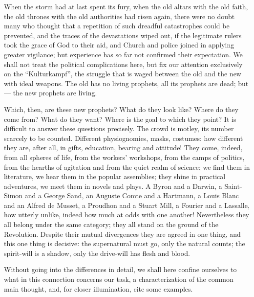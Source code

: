 \documentclass[12pt,a4paper,openany]{book}
\newcommand{\opage}[1]{\marginnote{\footnotesize\textit{[#1]}}}
\begin{document}
When the storm had at last spent its fury, when the old
altars with the old faith, the old thrones with the
old authorities had risen again, there were no doubt
\setcounter{footnote}{0}%
\opage{79}many who thought that a repetition of such dreadful
catastrophes could be prevented, and the traces of the devastations
wiped out, if the legitimate rulers
took the grace of God to their aid, and Church and police joined
in applying greater vigilance; but experience
has so far not confirmed their expectation. We shall
not treat the political complications here, but fix
our attention exclusively on the ``Kulturkampf'',
the struggle that is waged between the old and the new
with ideal weapons. The old has no living
prophets, all its prophets are dead; but --- the new
prophets are living.

Which, then, are these new prophets? What do they
look like? Where do they come from? What do they want? Where is
the goal to which they point? It is difficult to
answer these questions precisely. The crowd is
motley, its number scarcely to be counted. Different
physiognomies, masks, costumes: how different they are, after all,
in gifts, education, bearing and attitude!
They come, indeed, from all spheres of life, from the workers'
workshops, from the camps of politics, from the hearths of agitation
and from the quiet realm of science; we
find them in literature, we hear them in the popular assemblies;
they shine in practical adventures, we meet them
in novels and plays. A Byron and a Darwin, a
Saint-Simon and a George Sand, an Auguste Comte and a
Hartmann, a Louis Blanc and an Alfred de Musset, a
Proudhon and a Stuart Mill, a Fourier and a Lassalle,
how utterly unlike, indeed how much at odds with one another! Nevertheless
they all belong under the same category; they all stand
on the ground of the Revolution. Despite their mutual
divergences they are agreed in one thing, and this one thing is decisive: the
\setcounter{footnote}{0}%
\opage{80}supernatural must go, only the natural counts;
the spirit-will is a shadow, only the drive-will has flesh
and blood.

Without going into the differences in
detail, we shall here confine ourselves to what in
this connection concerns our task, a characterization
of the common main thought, and, for closer illumination,
cite some examples.
\end{document}
